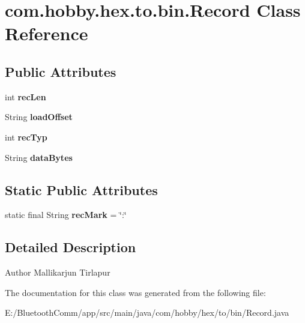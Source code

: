 \hypertarget{classcom_1_1hobby_1_1hex_1_1to_1_1bin_1_1_record}{}\section{com.\+hobby.\+hex.\+to.\+bin.\+Record Class Reference}
\label{classcom_1_1hobby_1_1hex_1_1to_1_1bin_1_1_record}
\subsection*{Public Attributes}
\begin{DoxyCompactItemize}
\item 
\mbox{\label{classcom_1_1hobby_1_1hex_1_1to_1_1bin_1_1_record_aafbe74fe4960e72787213c84ff29a2aa}} 
int {\bfseries rec\+Len}
\item 
\mbox{\label{classcom_1_1hobby_1_1hex_1_1to_1_1bin_1_1_record_ac6c4a3f25ceb6651aef3954847a158b6}} 
String {\bfseries load\+Offset}
\item 
\mbox{\label{classcom_1_1hobby_1_1hex_1_1to_1_1bin_1_1_record_a37f69b78ebabf0d903a6db6340f50315}} 
int {\bfseries rec\+Typ}
\item 
\mbox{\label{classcom_1_1hobby_1_1hex_1_1to_1_1bin_1_1_record_ab80549c4a483ac03f1c8cbf56c27dce2}} 
String {\bfseries data\+Bytes}
\end{DoxyCompactItemize}
\subsection*{Static Public Attributes}
\begin{DoxyCompactItemize}
\item 
\mbox{\label{classcom_1_1hobby_1_1hex_1_1to_1_1bin_1_1_record_ae4b4856387b1350218d1110281513e74}} 
static final String {\bfseries rec\+Mark} = \char`\"{}\+:\char`\"{}
\end{DoxyCompactItemize}


\subsection{Detailed Description}
\begin{DoxyAuthor}{Author}
Mallikarjun Tirlapur 
\end{DoxyAuthor}


The documentation for this class was generated from the following file\+:\begin{DoxyCompactItemize}
\item 
E\+:/\+Bluetooth\+Comm/app/src/main/java/com/hobby/hex/to/bin/Record.\+java\end{DoxyCompactItemize}
